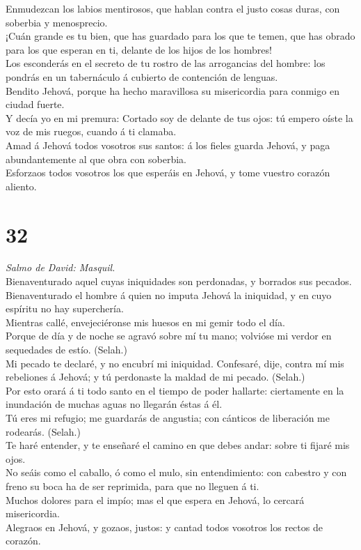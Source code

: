  Enmudezcan los labios mentirosos, que hablan contra el
justo cosas duras, con soberbia y menosprecio.\\
 ¡Cuán grande es tu bien, que has guardado para los que te
temen, que has obrado para los que esperan en ti, delante de los hijos
de los hombres!\\
 Los esconderás en el secreto de tu rostro de las
arrogancias del hombre: los pondrás en un tabernáculo á cubierto de
contención de lenguas.\\
 Bendito Jehová, porque ha hecho maravillosa su
misericordia para conmigo en ciudad fuerte.\\
 Y decía yo en mi premura: Cortado soy de delante de tus
ojos: tú empero oíste la voz de mis ruegos, cuando á ti clamaba.\\
 Amad á Jehová todos vosotros sus santos: á los fieles
guarda Jehová, y paga abundantemente al que obra con soberbia.\\
 Esforzaos todos vosotros los que esperáis en Jehová, y
tome vuestro corazón aliento.

\hypertarget{section-31}{%
\section{32}\label{section-31}}

 \emph{Salmo de David: Masquil.}\\
Bienaventurado aquel cuyas iniquidades son perdonadas, y borrados sus
pecados.\\
 Bienaventurado el hombre á quien no imputa Jehová la
iniquidad, y en cuyo espíritu no hay superchería.\\
 Mientras callé, envejeciéronse mis huesos en mi gemir todo
el día.\\
 Porque de día y de noche se agravó sobre mí tu mano;
volvióse mi verdor en sequedades de estío. (Selah.)\\
 Mi pecado te declaré, y no encubrí mi iniquidad. Confesaré,
dije, contra mí mis rebeliones á Jehová; y tú perdonaste la maldad de mi
pecado. (Selah.)\\
 Por esto orará á ti todo santo en el tiempo de poder
hallarte: ciertamente en la inundación de muchas aguas no llegarán éstas
á él.\\
 Tú eres mi refugio; me guardarás de angustia; con cánticos
de liberación me rodearás. (Selah.)\\
 Te haré entender, y te enseñaré el camino en que debes
andar: sobre ti fijaré mis ojos.\\
 No seáis como el caballo, ó como el mulo, sin
entendimiento: con cabestro y con freno su boca ha de ser reprimida,
para que no lleguen á ti.\\
 Muchos dolores para el impío; mas el que espera en Jehová,
lo cercará misericordia.\\
 Alegraos en Jehová, y gozaos, justos: y cantad todos
vosotros los rectos de corazón.

